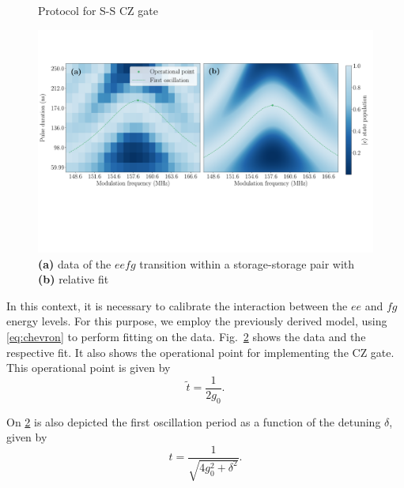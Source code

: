 \begin{figure}
    \centering
    
    \vspace{-1cm}
    \caption{Protocol for S-S CZ gate}
    \label{fig:SS_CZ}
\end{figure}

\begin{figure}[b]
    \centering
    \includegraphics[width=\linewidth]{Images//Chap3/Chevron_b_double.pdf}
    \caption{\textbf{(a)} data of the $eefg$ transition within a storage-storage pair with \textbf{(b)} relative fit}
    \label{fig:Chev_data}
\end{figure}

In this context, it is necessary to calibrate the interaction between the $ee$ and $fg$ energy levels.
For this purpose, we employ the previously derived model, using \cref{eq:chevron} to perform fitting on the data.
Fig.~\ref{fig:Chev_data} shows the data and the respective fit.
It also shows the operational point for implementing the CZ gate.
This operational point is given by
\begin{equation}
    \widetilde{t} = \frac{1}{2 g_0}.
\end{equation}

On \cref{fig:Chev_data} is also depicted the first oscillation period as a function of the detuning $\delta$, given by
\begin{equation}
    t = \frac{1}{\sqrt{4 g_0^2 + \delta^2}} . 
\end{equation}